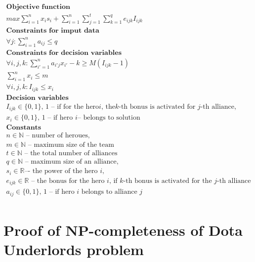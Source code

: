 \documentclass{article}
\begin{document}
\begin{equation}
\label{eq:DUIP}
\begin{gathered}
\textbf{Objective function}\\
max \sum_{i=1}^{n} x_i s_i + \sum_{i=1}^{n} \sum_{j=1}^{t}  \sum_{k=1}^{q} e_{ijk} I_{ijk} \\
\textbf{Constraints for imput data}\\
\forall{j} : \sum_{i=1}^n a_{ij} \le q \\
\textbf{Constraints for decision variables} \\
\forall{i,j,k} :  \sum_{i'=1}^{n} a_{i'j} x_{i'} - k \ge M( I_{ijk}  - 1) \\
\sum_{i=1}^n x_i \le m   \\ 
\forall{i,j,k} :  I_{ijk}  \le x_i \\
\textbf{Decision variables} \\
I_{ijk} \in \{0, 1\} \text {, 1 – if for the hero} i \text{, the} k\text{-th bonus is activated for }  j \text{-th alliance,} \\
x_i  \in \{0, 1\} \text{, 1 -- if hero } i \text{– belongs to solution} \\
\textbf{Constants} \\
n \in \mathbb{N} \text{ -- number of heroues,} \\
m \in \mathbb{N} \text{ -- maximum size of the team}\\
t \in \mathbb{N} \text{ -- the total number of alliances} \\
q \in \mathbb{N} \text{ -- maximum size of an alliance,} \\
s_i  \in \mathbb{R} \text{–- the power of the hero } i, \\
e_{ijk} \in \mathbb{R} \text{ -- the bonus for the hero } i \text{,  if } k
\text{-th bonus is activated for the } j \text{-th alliance} \\
a_{ij} \in \{0, 1\} \text{, 1 -- if hero } i \text{ belongs to alliance } j \\ 
\end{gathered}
\end{equation}

\section{Proof of NP-completeness of Dota Underlords problem}
\label{SectionNPCompleteProof}
\end{document}
